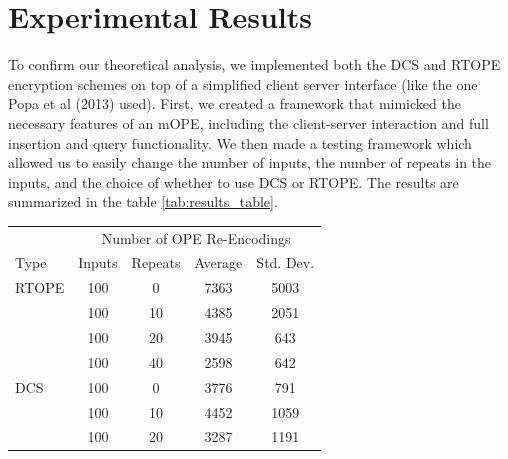 \documentclass[12pt]{article}
\begin{document}
\section{Experimental Results}

To confirm our theoretical analysis, we implemented both the DCS and RTOPE encryption schemes on top of a simplified client server interface (like the one Popa et al (2013) used). First, we created a framework that mimicked the necessary features of an mOPE, including the client-server interaction and full insertion and query functionality. We then made a testing framework which allowed us to easily change the number of inputs, the number of repeats in the inputs, and the choice of whether to use DCS or RTOPE. The results are summarized in the table \ref{tab:results_table}.

\begin{table} %
\centering %
\begin{tabular}{l c c c c} %
\toprule %
& \multicolumn{4}{c}{Number of OPE Re-Encodings} \\ %
\cmidrule(l){2-5} %
Type & Inputs & Repeats & Average & Std. Dev.\\ %
\midrule %
RTOPE & 100 & 0  & 7363 & 5003 \\
      & 100 & 10  & 4385 & 2051 \\
      & 100 & 20  & 3945 & 643\\
      & 100 & 40  & 2598 & 642\\
      \midrule
DCS   & 100 & 0  & 3776 & 791 \\
      & 100 & 10  & 4452 & 1059 \\
      & 100 & 20  & 3287 & 1191\\

\end{tabular}
\end{table}
\end{document}
